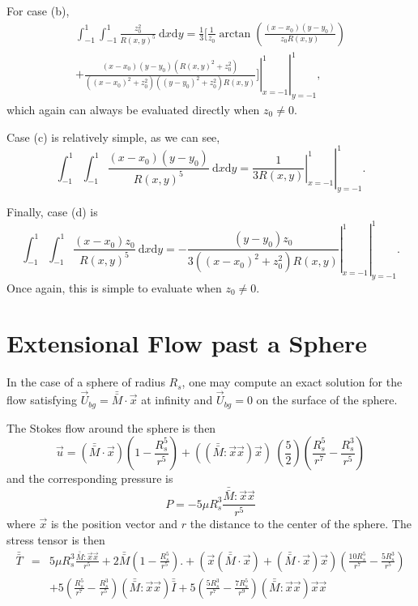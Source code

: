 For case (b),
\begin{align}
\int_{-1}^1 \int_{-1}^1
\frac{ z_0^2     }{R(x,y)^5 }
\ \text{d}x \text{d}y
=
\frac{1}{3}
\biggl[
\frac{1}{z_0}
\arctan \left(\frac{(x-x_0) (y-y_0)}{z_0 R(x,y)}\right)
\nonumber \\
 \left. \left. +\frac{(x-x_0) (y-y_0) \left(R(x,y)^2+ z_0^2\right)}{\left((x-x_0)^2+z_0^2\right) \left((y-y_0)^2+z_0^2\right) R(x,y)}
\biggr] \right|_{x=-1}^1 \right|_{y=-1}^1 ,
\label{eq_dlp_int_zz}
\end{align}
which again can always be evaluated directly when $z_0\neq0$.


Case (c) is relatively simple, as we can see, 
\begin{equation}
\int_{-1}^1 \int_{-1}^1
\frac{ (x-x_0)(y-y_0)    }{R(x,y)^5 }
\ \text{d}x \text{d}y
= \left. \left.
\frac{1}{3 R(x,y)} \right|_{x=-1}^1 \right|_{y=-1}^1 .
\label{eq_dlp_int_xy}
\end{equation}


Finally, case (d) is 
\begin{equation}
\int_{-1}^1 \int_{-1}^1
\frac{ (x-x_0)z_0    }{R(x,y)^5 }
\ \text{d}x \text{d}y
= \left. \left.
-\frac{(y-y_0) z_0}{3 \left((x-x_0)^2+z_0^2\right) R(x,y)} \right|_{x=-1}^1 \right|_{y=-1}^1.
\label{eq_dlp_int_xz}
\end{equation}
Once again, this is simple to evaluate when $z_0\neq0$.


\section{Extensional Flow past a Sphere}


In the case of a sphere of radius $R_s$, one may compute an exact solution for the flow satisfying $\vec{U}_{bg} = \bar{\bar{M}}\cdot \vec{x}$ at infinity and $\vec{U}_{bg} = 0$ on the surface of the sphere. 

The Stokes flow around the sphere is then \cite{guazzelli_physical_2011}
\[
\vec{u} = \left( \bar{\bar{M}} \cdot \vec{x} \right) \left( 1 - \frac{R_s^5}{r^5} \right) + \left( (\bar{\bar{M}} : \vec{x} \vec{x}) \vec{x} \right) \ \left( \frac{5}{2} \right)\left( \frac{R_s^5}{r^7}- \frac{R_s^3}{r^5} \right)
\]
and the corresponding pressure is
\[
P = - 5 \mu R_s^3  \frac{\bar{\bar{M}} : \vec{x}\vec{x}}{r^5}
\]
where $\vec{x}$ is the position vector and $r$ the distance to the center of the sphere. The stress tensor is then
\begin{eqnarray*}
\bar{\bar{T}} &=&  5 \mu R_s^3  \frac{\bar{\bar{M}} : \vec{x}\vec{x}}{r^5} + 2 \bar{\bar{M}} \left( 1 - \frac{R_s^5}{r^5} \right).+ ( \vec{x} (\bar{\bar{M}} \cdot \vec{x})  +  (\bar{\bar{M}} \cdot \vec{x}) \vec{x} ) \left( \frac{10R_s^5}{r^7} - \frac{5R_s^3}{r^5} \right)  \\
& & + 5 \left( \frac{R_s^5}{r^7}- \frac{R_s^3}{r^5} \right) (\bar{\bar{M}} : \vec{x}\vec{x}) \bar{\bar{I}} +  5 \left( \frac{5R_s^3}{r^7}- \frac{7R_s^5}{r^9} \right) (\bar{\bar{M}} : \vec{x}\vec{x}) \vec{x} \vec{x}
\end{eqnarray*}

